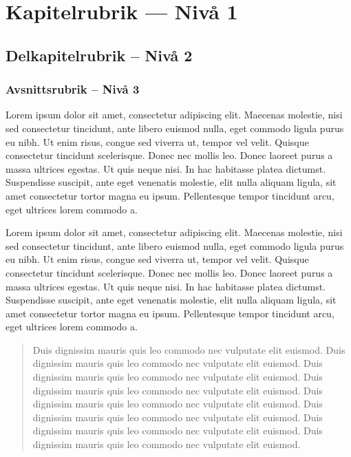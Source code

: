\section{Kapitelrubrik --- Nivå 1}

\subsection{Delkapitelrubrik -- Nivå 2}

\subsubsection{Avsnittsrubrik -- Nivå 3}
Lorem ipsum dolor sit amet, consectetur adipiscing elit. Maecenas molestie, nisi sed consectetur tincidunt, ante libero euismod nulla, eget commodo ligula purus eu nibh. Ut enim risus, congue sed viverra ut, tempor vel velit. Quisque consectetur tincidunt scelerisque. Donec nec mollis leo. Donec laoreet purus a massa ultrices egestas. Ut quis neque nisi. In hac habitasse platea dictumst. Suspendisse suscipit, ante eget venenatis molestie, elit nulla aliquam ligula, sit amet consectetur tortor magna eu ipsum. Pellentesque tempor tincidunt arcu, eget ultrices lorem commodo a.

Lorem ipsum dolor sit amet, consectetur adipiscing elit. Maecenas molestie, nisi sed consectetur tincidunt, ante libero euismod nulla, eget commodo ligula purus eu nibh. Ut enim risus, congue sed viverra ut, tempor vel velit. Quisque consectetur tincidunt scelerisque. Donec nec mollis leo. Donec laoreet purus a massa ultrices egestas. Ut quis neque nisi. In hac habitasse platea dictumst. Suspendisse suscipit, ante eget venenatis molestie, elit nulla aliquam ligula, sit amet consectetur tortor magna eu ipsum. Pellentesque tempor tincidunt arcu, eget ultrices lorem commodo a.

\begin{quote}
  Duis dignissim mauris quis leo commodo nec vulputate elit euismod. Duis dignissim mauris quis leo commodo nec vulputate elit euismod. Duis dignissim mauris quis leo commodo nec vulputate elit euismod. Duis dignissim mauris quis leo commodo nec vulputate elit euismod. Duis dignissim mauris quis leo commodo nec vulputate elit euismod. Duis dignissim mauris quis leo commodo nec vulputate elit euismod. Duis dignissim mauris quis leo commodo nec vulputate elit euismod. Duis dignissim mauris quis leo commodo nec vulputate elit euismod.
\end{quote}

